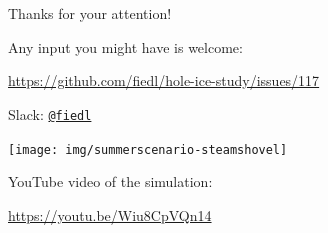 \section{}
\begin{frame}[fragile]{Thanks for your attention!}
  \begin{center}
  Any input you might have is welcome: \\ \vspace{0.3cm}

  \url{https://github.com/fiedl/hole-ice-study/issues/117} \\ \vspace{0.1cm}

  Slack:
  \href{https://icecube-spno.slack.com/messages/@U092MBFU2}{\texttt{@fiedl}}

  \vspace{1.5cm}

  \texttt{[image: img/summerscenario-steamshovel]}

  YouTube video of the simulation:

  \url{https://youtu.be/Wiu8CpVQn14}

  \end{center}
\end{frame}